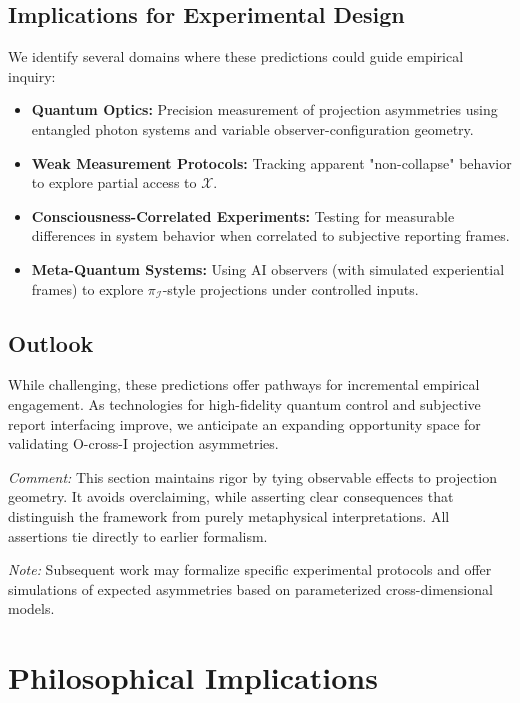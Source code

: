 \documentclass{article}
\begin{document}
\subsection{Implications for Experimental Design}

We identify several domains where these predictions could guide empirical inquiry:

\begin{itemize}
    \item \textbf{Quantum Optics:} Precision measurement of projection asymmetries using entangled photon systems and variable observer-configuration geometry.
    \item \textbf{Weak Measurement Protocols:} Tracking apparent "non-collapse" behavior to explore partial access to $\mathcal{X}$.
    \item \textbf{Consciousness-Correlated Experiments:} Testing for measurable differences in system behavior when correlated to subjective reporting frames.
    \item \textbf{Meta-Quantum Systems:} Using AI observers (with simulated experiential frames) to explore $\pi_{\mathcal{I}}$-style projections under controlled inputs.
\end{itemize}

\subsection{Outlook}

While challenging, these predictions offer pathways for incremental empirical engagement. As technologies for high-fidelity quantum control and subjective report interfacing improve, we anticipate an expanding opportunity space for validating O-cross-I projection asymmetries.

\textit{Comment:} This section maintains rigor by tying observable effects to projection geometry. It avoids overclaiming, while asserting clear consequences that distinguish the framework from purely metaphysical interpretations. All assertions tie directly to earlier formalism.

\textit{Note:} Subsequent work may formalize specific experimental protocols and offer simulations of expected asymmetries based on parameterized cross-dimensional models.




\section{Philosophical Implications}
\end{document}
